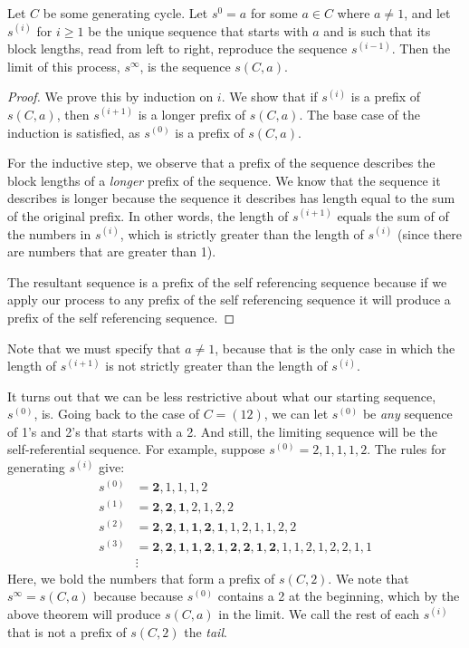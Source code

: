 \documentclass[runningheads,a4paper]{llncs}
\begin{document}
\begin{theorem}
Let $C$ be some generating cycle. Let $s^0 = a$ for some $a \in C$ where $a \neq 1$, and let $s^{(i)}$ for $i \geq 1$ be the unique sequence that starts with $a$ and is such that its block lengths, read from left to right, reproduce the sequence $s^{(i-1)}$. Then the limit of this process, $s^\infty$, is the sequence $s(C,a)$.
\end{theorem}

\begin{proof}
We prove this by induction on $i$. We show that if $s^{(i)}$ is a prefix of $s(C,a)$, then $s^{(i+1)}$ is a longer prefix of $s(C,a)$. The base case of the induction is satisfied, as $s^{(0)}$ is a prefix of $s(C,a)$.

For the inductive step, we observe that a prefix of the sequence describes the block lengths of a \emph{longer} prefix of the sequence. We know that the sequence it describes is longer because the sequence it describes has length equal to the sum of the original prefix. In other words, the length of $s^{(i+1)}$ equals the sum of of the numbers in $s^{(i)}$, which is strictly greater than the length of $s^{(i)}$ (since there are numbers that are greater than 1). 

The resultant sequence is a prefix of the self referencing sequence because if we apply our process to any prefix of the self referencing sequence it will produce a prefix of the self referencing sequence.  
\end{proof}

Note that we must specify that $a \neq 1$, because that is the only case in which the length of $s^{(i+1)}$ is not strictly greater than the length of $s^{(i)}$. 

It turns out that we can be less restrictive about what our starting sequence, $s^{(0)}$, is. Going back to the case of $C = (1 2)$, we can let $s^{(0)}$ be \emph{any} sequence of 1's and 2's that starts with a 2. And still, the limiting sequence will be the self-referential sequence.
For example, suppose $s^{(0)} = 2,1,1,1,2$. The rules for generating $s^{(i)}$ give:
\begin{align*}
s^{(0)}&= \mathbf{2},1,1,1,2\\
s^{(1)} &= \mathbf{2,2,1},2,1,2,2\\
s^{(2)} &= \mathbf{2,2,1,1,2,1},1,2,1,1,2,2\\
s^{(3)} &= \mathbf{2,2,1,1,2,1,2,2,1,2},1,1,2,1,2,2,1,1\\
&\vdots
\end{align*}
Here, we bold the numbers that form a prefix of $s(C,2)$. We note that $s^\infty = s(C,a)$ because because $s^{(0)}$ contains a 2 at the beginning, which by the above theorem will produce $s(C,a)$ in the limit. We call the rest of each $s^{(i)}$ that is not a prefix of $s(C,2)$ the \emph{tail}.
\end{document}
